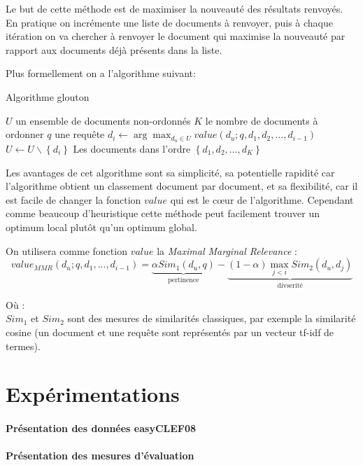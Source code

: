\documentclass{article}
\begin{document}
Le but de cette méthode est de maximiser la nouveauté des résultats renvoyés. En pratique on incrémente une liste de documents à renvoyer, puis à chaque itération on va chercher à renvoyer le document qui maximise la nouveauté par rapport aux documents déjà présents dans la liste.

Plus formellement on a l'algorithme suivant:

\begin{algorithm}
\caption{Algorithme glouton}
\begin{algorithmic}
\REQUIRE $U$ un ensemble de documents non-ordonnés
\REQUIRE $K$ le nombre de documents à ordonner
\REQUIRE $q$ une requête
\STATE $d_i \leftarrow \arg\max_{d_u \in U} value(d_u;q, d_1,d_2,\dots,d_{i-1})$ 
\STATE $U \leftarrow U \backslash \left\{d_i\right\}$
\ENDFOR
\RETURN Les documents dans l'ordre $\left\{d_1, d_2,\dots, d_K\right\}$
\end{algorithmic}
\end{algorithm}

Les avantages de cet algorithme sont sa simplicité, sa potentielle rapidité car l'algorithme obtient un classement document par document, et sa flexibilité, car il est facile de changer la fonction $value$ qui est le cœur de l'algorithme. Cependant comme beaucoup d'heuristique cette méthode peut facilement trouver un optimum local plutôt qu'un optimum global.


On utilisera comme fonction $value$ la \textit{Maximal Marginal Relevance} : 
$$value_{MMR}(d_u;q,d_1,...,d_{i-1}) = \underbrace{\alpha Sim_{1}(d_u,q)}_{\text{pertinence}} - \underbrace{(1-\alpha)\max\limits_{j < i} Sim_{2}(d_u, d_j)}_{\text{divserité}}$$

Où :\\
$Sim_{1}$ et $Sim_{2}$ sont des mesures de similarités classiques, par exemple la similarité cosine (un document et une requête sont représentés par un vecteur tf-idf de termes).

\newpage
\section{Expérimentations}
\paragraph{Présentation des données easyCLEF08}

\paragraph{Présentation des mesures d'évaluation}
\end{document}
